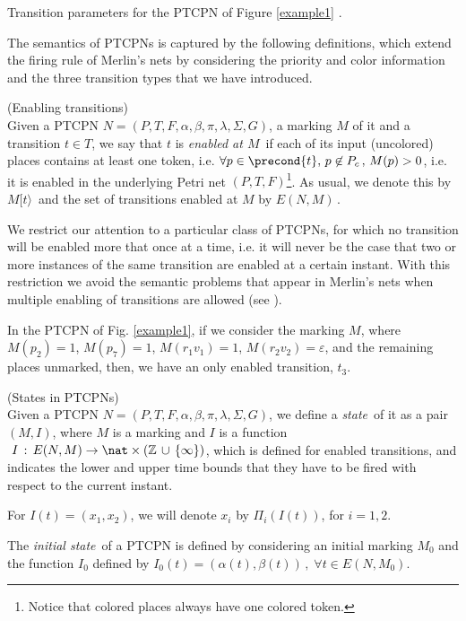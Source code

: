 {\begin{table}[!h]
\begin{center}
\caption{Transition parameters for the PTCPN of Figure \ref{example1} \label{tabla_ex}.} %
\end{center}
\end{table}

The semantics of PTCPNs is captured by the following definitions, which
extend the firing rule of Merlin's nets by considering the priority
and color information and the three transition types that we have
introduced.

\bdfn (Enabling transitions)\\
Given a PTCPN $N=(P,T,F,\alpha,\beta,\pi,\lambda,\Sigma, G)$, a
marking $M$ of it and a transition $t \in T$, we say that $t$ is
{\em enabled at $M$\,} if each of its input (uncolored) places
contains at least one token, i.e. $\forall p \in \precond{t},\,
p\not\in P_c\,,\, M(p)>0$, i.e. it is enabled in the underlying
Petri net $(P,T,F)$\footnote{Notice that colored places always have
one colored token.}. As usual, we denote this by $M[t\rangle$\, and
the set of transitions enabled at $M$ by $E(N,M)$\,. \edfn

We restrict our attention to a particular class of PTCPNs, for which
no transition will be enabled more that once at a time, i.e. it
will never be the case that two or more instances of the same
transition are enabled at a certain instant. With this restriction
we avoid the semantic problems that appear in Merlin's nets when
multiple enabling of transitions are allowed (see \cite{Wan98}).

\bex\label{ex2} In the PTCPN of Fig. \ref{example1}, if we consider
the marking $M$, where $M(p_2)=1$, $M(p_7)=1$, $M(r_1v_1)=1$,
$M(r_2v_2)=\varepsilon$,  and the remaining places  unmarked, then, we
have an only  enabled transition, $t_3$.
\eex

\bdfn (States in PTCPNs)\\
Given a PTCPN $N=(P,T,F,\alpha,\beta,\pi,\lambda,\Sigma, G)$, we
define a {\em state}\, of it
as a pair $(M,I)$, where $M$ is a marking and $I$ is a %
function $\,\,I\,:\, E(N,M) \rightarrow \nat \times ( \mathbb{Z }
\,\cup\,\{\infty\})$, which is defined for enabled transitions, and
indicates the lower and upper time bounds that they have to be fired
with respect to the current instant.

For $I(t)=(x_1,x_2)$, we will denote $x_i$ by $\Pi_i(I(t))$, for
$i=1,2$.

The {\em initial state}\, of a PTCPN is defined by considering an
initial marking $M_0$ and the function $I_0$ defined by $I_0(t) =
 (\alpha(t),\beta(t))\,, \; \forall t \in E(N,M_0).
$
\edfn

}
